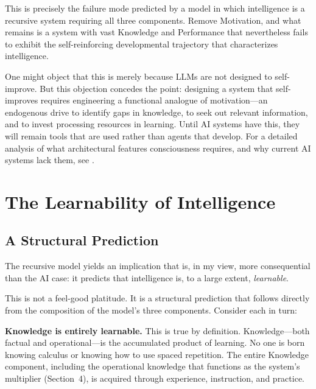 \documentclass[12pt,a4paper]{article}
\begin{document}
This is precisely the failure mode predicted by a model in which intelligence is a recursive system requiring all three components. Remove Motivation, and what remains is a system with vast Knowledge and Performance that nevertheless fails to exhibit the self-reinforcing developmental trajectory that characterizes intelligence.

One might object that this is merely because LLMs are not designed to self-improve. But this objection concedes the point: designing a system that self-improves requires engineering a functional analogue of motivation---\hspace{0pt}an endogenous drive to identify gaps in knowledge, to seek out relevant information, and to invest processing resources in learning. Until AI systems have this, they will remain tools that are used rather than agents that develop. For a detailed analysis of what architectural features consciousness requires, and why current AI systems lack them, see \citet{Gruber2026}.


\section{The Learnability of Intelligence}

\subsection{A Structural Prediction}

The recursive model yields an implication that is, in my view, more consequential than the AI case: it predicts that intelligence is, to a large extent, \emph{learnable}.

This is not a feel-good platitude. It is a structural prediction that follows directly from the composition of the model's three components. Consider each in turn:

\textbf{Knowledge is entirely learnable.} This is true by definition. Knowledge---\hspace{0pt}both factual and operational---\hspace{0pt}is the accumulated product of learning. No one is born knowing calculus or knowing how to use spaced repetition. The entire Knowledge component, including the operational knowledge that functions as the system's multiplier (Section~4), is acquired through experience, instruction, and practice.
\end{document}
